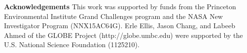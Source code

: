 \documentclass[12pt]{article}
\newcounter{lastnote}
\begin{document}









\noindent \textbf{Acknowledgements} This work was supported by funds from the Princeton Environmental Institute Grand Challenges program and the NASA New Investigator Program (NNX15AC64G). Erle Ellis, Jason Chang, and Labeeb Ahmed of the GLOBE Project (http://globe.umbc.edu) were supported by the U.S. National Science Foundation (1125210).






\end{document}
